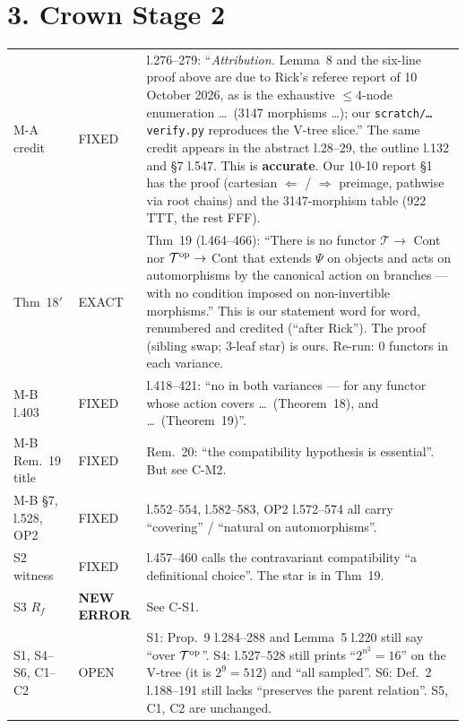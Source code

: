 \documentclass[10pt]{article}
\newcommand{\T}{\mathcal T}
\begin{document}
\section*{3. Crown Stage 2}
\begin{tabular}{p{2.2cm}p{1.5cm}p{12.5cm}}
\toprule
M-A credit & FIXED & l.276--279: ``\emph{Attribution.} Lemma~8 and the six-line proof above are due to Rick's referee report
of 10 October 2026, as is the exhaustive $\le4$-node enumeration \dots\ (3147 morphisms \dots); our
\texttt{scratch/\dots verify.py} reproduces the V-tree slice.'' The same credit appears in the abstract l.28--29, the
outline l.132 and \S7 l.547. This is \textbf{accurate}. Our 10-10 report \S1 has the proof (cartesian $\Leftarrow$ /
$\Rightarrow$ preimage, pathwise via root chains) and the 3147-morphism table (922 TTT, the rest FFF).\\
Thm~18$'$ & EXACT & Thm~19 (l.464--466): ``There is no functor $\T\to$ Cont nor $\T^{\rm op}\to$ Cont that extends $\Psi$ on
objects and acts on automorphisms by the canonical action on branches --- with no condition imposed on
non-invertible morphisms.'' This is our statement word for word, renumbered and credited (``after Rick''). The
proof (sibling swap; 3-leaf star) is ours. Re-run: 0 functors in each variance.\\
M-B l.403 & FIXED & l.418--421: ``no in both variances --- for any functor whose action covers \dots\ (Theorem~18), and \dots\
(Theorem~19)''.\\
M-B Rem.~19 title & FIXED & Rem.~20: ``the compatibility hypothesis is essential''. But see C-M2.\\
M-B \S7, l.528, OP2 & FIXED & l.552--554, l.582--583, OP2 l.572--574 all carry ``covering'' / ``natural on automorphisms''.\\
S2 witness & FIXED & l.457--460 calls the contravariant compatibility ``a definitional choice''. The star is in Thm~19.\\
S3 $R_f$ & \textbf{NEW ERROR} & See C-S1.\\
S1, S4--S6, C1--C2 & OPEN & S1: Prop.~9 l.284--288 and Lemma~5 l.220 still say ``over $\T^{\rm op}$''. S4: l.527--528 still prints
``$2^{n^2}=16$'' on the V-tree (it is $2^9=512$) and ``all sampled''. S6: Def.~2 l.188--191 still lacks ``preserves the
parent relation''. S5, C1, C2 are unchanged.\\
\bottomrule
\end{tabular}
\end{document}
